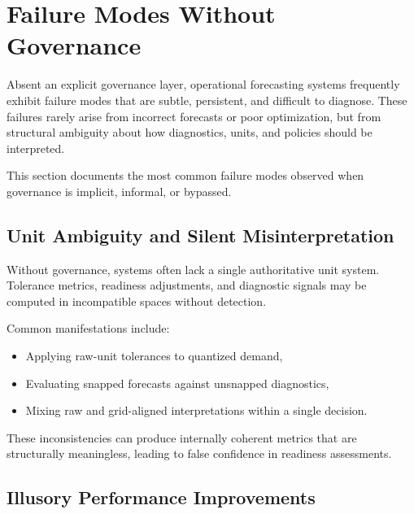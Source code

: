 
\section{Failure Modes Without Governance}
\label{sec:governance_failure_modes}

Absent an explicit governance layer, operational forecasting systems frequently
exhibit failure modes that are subtle, persistent, and difficult to diagnose.
These failures rarely arise from incorrect forecasts or poor optimization, but
from structural ambiguity about how diagnostics, units, and policies should be
interpreted.

This section documents the most common failure modes observed when governance is
implicit, informal, or bypassed.



\subsection{Unit Ambiguity and Silent Misinterpretation}

Without governance, systems often lack a single authoritative unit system.
Tolerance metrics, readiness adjustments, and diagnostic signals may be computed
in incompatible spaces without detection.

Common manifestations include:
\begin{itemize}[leftmargin=1.5em]
  \item Applying raw-unit tolerances to quantized demand,
  \item Evaluating snapped forecasts against unsnapped diagnostics,
  \item Mixing raw and grid-aligned interpretations within a single decision.
\end{itemize}

These inconsistencies can produce internally coherent metrics that are
structurally meaningless, leading to false confidence in readiness assessments.

\subsection{Illusory Performance Improvements}


